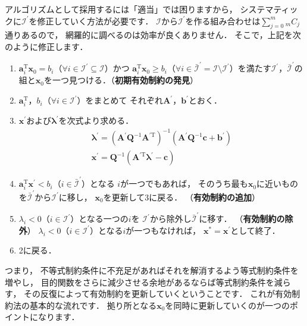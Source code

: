 ﻿\documentclass{jsarticle}
\begin{document}
アルゴリズムとして採用するには「適当」では困りますから，
システマティックに$\mathcal{I}^{\prime}$を修正していく方法が必要です．
$\mathcal{I}$から$\mathcal{I}^{\prime}$を作る組み合わせは$\sum_{j=0}^{m}{}_{m}C_{j}$通りあるので，
網羅的に調べるのは効率が良くありません．
そこで，上記を次のように修正します．
\begin{screen}
\begin{enumerate}
\item{
$\boldsymbol{a}_{i}^{\mathrm{T}}\boldsymbol{x}_{0}=b_{i}$（$\forall i\in\mathcal{I}^{\prime}\subseteq\mathcal{I}$）かつ
$\boldsymbol{a}_{i}^{\mathrm{T}}\boldsymbol{x}_{0}\geq b_{i}$（$\forall i\in\bar{\mathcal{I}}^{\prime}=\mathcal{I}\setminus\mathcal{I}^{\prime}$）を満たす$\mathcal{I}^{\prime}$，$\bar{\mathcal{I}}^{\prime}$の組と$\boldsymbol{x}_{0}$を一つ見つける．（{\bf 初期有効制約の発見}）}
\item{
$\boldsymbol{a}_{i}^{\mathrm{T}}$，$b_{i}$（$\forall i\in\mathcal{I}^{\prime}$）をまとめて
それぞれ$\boldsymbol{A}^{\prime}$，$\boldsymbol{b}^{\prime}$とおく．
}
\item{$\boldsymbol{x}^{\prime}$および$\boldsymbol{\lambda}^{\prime}$を次式より求める．
\begin{align*}
\boldsymbol{\lambda}^{\prime}
=
\left(\boldsymbol{A}^{\prime}\boldsymbol{Q}^{-1}\boldsymbol{A}^{\prime\mathrm{T}}\right)^{-1}
\left(
\boldsymbol{A}^{\prime}\boldsymbol{Q}^{-1}\boldsymbol{c}
+
\boldsymbol{b}^{\prime}
\right)
\\
\boldsymbol{x}^{\prime}
=
\boldsymbol{Q}^{-1}
\left(
\boldsymbol{A}^{\prime\mathrm{T}}\boldsymbol{\lambda}^{\prime}-\boldsymbol{c}
\right)
\end{align*}
}
\item{
$\boldsymbol{a}_{i}^{\mathrm{T}}\boldsymbol{x}^{\prime}<b_{i}$（$i\in\bar{\mathcal{I}}^{\prime}$）となる
$i$が一つでもあれば，
そのうち最も$\boldsymbol{x}_{0}$に近いものを$\bar{\mathcal{I}}^{\prime}$から$\mathcal{I}^{\prime}$に移し，
$\boldsymbol{x}_{0}$を更新して3に戻る．
（{\bf 有効制約の追加}）}
\item{$\lambda_{i}<0$（$i\in\mathcal{I}^{\prime}$）となる一つの$i$を
$\mathcal{I}^{\prime}$から除外し$\bar{\mathcal{I}}^{\prime}$に移す．
（{\bf 有効制約の除外}）
$\lambda_{i}<0$（$i\in\mathcal{I}^{\prime}$）となる$i$が一つもなければ，
$\boldsymbol{x}^{*}=\boldsymbol{x}^{\prime}$として終了．}
\item{2に戻る．}
\end{enumerate}
\end{screen}
つまり，
不等式制約条件に不充足があればそれを解消するよう等式制約条件を増やし，
目的関数をさらに減少させる余地があるならば等式制約条件を減らす，
その反復によって有効制約を更新していくということです．
これが有効制約法の基本的な流れです．
拠り所となる$\boldsymbol{x}_{0}$を同時に更新していくのが一つのポイントになります．
\end{document}

